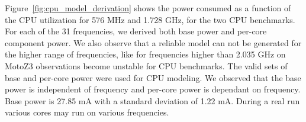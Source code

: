 Figure~\ref{fig:cpu_model_derivation} shows 
the power consumed as a function of the CPU utilization for 576 MHz and 1.728 GHz,
for the two CPU benchmarks.
For each of the 31 frequencies, we derived both base power and per-core component power.
We also observe that a reliable model can not be generated for the higher range of frequencies, like for frequencies higher than 2.035 GHz on MotoZ3 observations become unstable for CPU benchmarks.
The valid sets of base and per-core power were used for CPU modeling.
We observed that the base power is independent of frequency and per-core power is dependant on frequency.
Base power is 27.85 mA with a standard deviation of 1.22 mA.
% 
During a  real run various cores may run on various frequencies.
\fi

